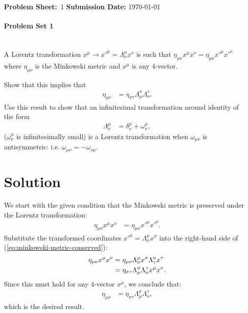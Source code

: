 {\large\textbf{Problem Sheet:}\ \textsc{1} \hspace{\hfill} \large\textbf{Submission Date:} \today\\
	\hline\hline
\paragraph*{Problem Set 1} %
\\
A Lorentz transformation $x^\mu \rightarrow x'^\mu = \Lambda^\mu_\nu x^\nu$ is such that $\eta_{\mu\nu} x^\mu x^\nu = \eta_{\mu\nu} x'^\mu x'^\nu$ where $\eta_{\mu\nu}$ is the Minkowski metric and $x^\mu$ is any 4-vector.

    Show that this implies that
    \begin{align*}
        \eta_{\mu\nu} &= \eta_{\sigma\tau} \Lambda^\sigma_\mu \Lambda^\tau_\nu.
    \end{align*}
    Use this result to show that an infinitesimal transformation around identity of the form
    \begin{align*}
        \Lambda^\mu_\nu &= \delta^\mu_\nu + \omega^\mu_\nu,
    \end{align*}
    ($\omega^\mu_\nu$ is infinitesimally small) is a Lorentz transformation when $\omega_{\mu\nu}$ is antisymmetric: i.e. $\omega_{\mu\nu} = -\omega_{\nu\mu}$.
    
\bigskip\bigskip\hline\hline\bigskip

\section*{Solution}
We start with the given condition that the Minkowski metric is preserved under the Lorentz transformation:
\begin{align}
    \eta_{\mu\nu} x^\mu x^\nu &= \eta_{\mu\nu} x'^\mu x'^\nu.\label{eq:minkowski-metric-conserved}
\end{align}
Substitute the transformed coordinates \(x'^\mu = \Lambda^\mu_\sigma x^\sigma\) into the right-hand side of (\ref{eq:minkowski-metric-conserved}):
\begin{align}
    \eta_{\mu\nu} x^\mu x^\nu &= \eta_{\mu\nu} \Lambda^\mu_\sigma x^\sigma \Lambda^\nu_\tau x^\tau\notag\\
    &= \eta_{\sigma\tau} \Lambda^\sigma_\mu \Lambda^\tau_\nu x^\mu x^\nu.
\end{align}
Since this must hold for any 4-vector \(x^\mu\), we conclude that:
\begin{align}
    \eta_{\mu\nu} &= \eta_{\sigma\tau} \Lambda^\sigma_\mu \Lambda^\tau_\nu,\label{eq:desired-result}
\end{align}
which is the desired result.

}
